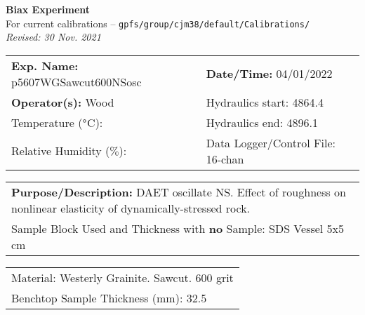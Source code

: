 \documentclass[letterpaper, 10pt]{article}
\begin{document}
\begin{center}
    {\Large \textbf{Biax Experiment}}\\
    {\small For current calibrations -- \texttt{gpfs/group/cjm38/default/Calibrations/}}\\
    {\footnotesize \textit{Revised: 30 Nov. 2021}}
\end{center}



\begin{table}[!ht]
	\renewcommand{\arraystretch}{1.1}
	\begin{tabular}{p{10cm} p{10cm} }
	    \textbf{Exp. Name: }p5607WGSawcut600NSosc & \textbf{Date/Time: }04/01/2022\\
	    \textbf{Operator(s): }Wood & Hydraulics start: 4864.4 \\
	    Temperature ($\degree$C):  & Hydraulics end: 4896.1 \\
	    Relative Humidity ($\%$):  & Data Logger/Control File: 16-chan \\
	\end{tabular}
\end{table} 
\vspace{-0.5cm} 

\begin{table}[!ht]
	\renewcommand{\arraystretch}{1.1}
	\begin{tabular}{p{20cm}}\textbf{Purpose/Description:} DAET oscillate NS. Effect of roughness on nonlinear elasticity of dynamically-stressed rock.  \\Sample Block Used and Thickness with \textbf{no} Sample: SDS Vessel 5x5 cm \\
	\end{tabular}
    \end{table} \vspace{-0.5cm} 

\begin{table}[!ht]
        \small
        \renewcommand{\arraystretch}{1.2}
        \begin{tabular}{ |p{7cm}| } \hline 
Material: Westerly Grainite. Sawcut. 600 grit \\Benchtop Sample Thickness (mm): 32.5 \\ \hline \end{tabular} \end{table} \vspace{-0.5cm} 
\end{document}
